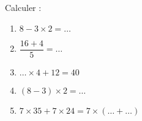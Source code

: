 
\begin{exercice}\label{exosmath-0813}

    Calculer :
    \begin{enumerate}
        \item
            \( 8-3\times 2=\ldots\)
        \item
            \( \dfrac{ 16+4 }{ 5 }=\ldots\)
        \item
            \( \ldots \times 4+12=40\)
        \item
            \( (8-3)\times 2=\ldots\)
        \item
            \( 7\times 35+7\times 24=7\times(\ldots +\ldots)\)
    \end{enumerate}


\end{exercice}
